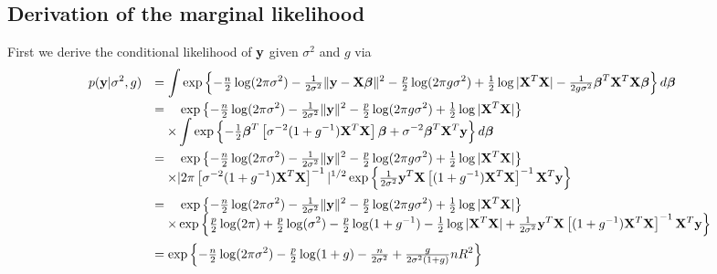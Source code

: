\subsection{Derivation of the marginal likelihood}

 
\noindent First we derive the conditional likelihood of ${\bf y}$ given $\sigma^2$ and $g$ via
$$
\begin{array}{rl}
	\displaystyle p({\bf y}|\sigma^2,g) 
	  & \displaystyle = \int \exp\left\{ 
	-\tfrac{n}{2}\log(2\pi\sigma^2) - \tfrac{1}{2\sigma^2}\|{\bf y} - {\bf X}{\boldsymbol \beta}\|^2
	-\tfrac{p}{2}\log(2\pi g\sigma^2) + \tfrac{1}{2}\log|{\bf X}^T{\bf X}| - \tfrac{1}{2g\sigma^2}{\boldsymbol \beta}^T{\bf X}^T{\bf X}{\boldsymbol \beta}
	\right\} d{\boldsymbol \beta}
	\\ [2ex]
	  & \displaystyle = \quad \exp\left\{      
	-\tfrac{n}{2}\log(2\pi\sigma^2) - \tfrac{1}{2\sigma^2}\|{\bf y}\|^2 -\tfrac{p}{2}\log(2\pi g\sigma^2) + \tfrac{1}{2}\log|{\bf X}^T{\bf X}| \right\}
	\\
	  & \displaystyle \quad \times \int 
	\exp\left\{ - \tfrac{1}{2}{\boldsymbol \beta}^T \left[ \sigma^{-2}(1+g^{-1}){\bf X}^T{\bf X} \right]{\boldsymbol\beta} + \sigma^{-2}{\boldsymbol \beta}^T{\bf X}^T{\bf y}
	\right\} d{\boldsymbol \beta} \\ [2ex]
	  & \displaystyle = \quad \exp\left\{      
	-\tfrac{n}{2}\log(2\pi\sigma^2) - \tfrac{1}{2\sigma^2}\|{\bf y}\|^2 -\tfrac{p}{2}\log(2\pi g\sigma^2) + \tfrac{1}{2}\log|{\bf X}^T{\bf X}| \right\}
	\\
	  & \displaystyle \quad \times      
	|2\pi \left[ \sigma^{-2}(1+g^{-1}){\bf X}^T{\bf X} \right]^{-1}|^{1/2}\exp\left\{  \tfrac{1}{2\sigma^2}  {\bf y}^T{\bf X}\left[ (1+g^{-1}){\bf X}^T{\bf X} \right]^{-1}{\bf X}^T{\bf y}
	\right\}
	\\ [2ex]
	  & \displaystyle = \quad \exp\left\{      
	-\tfrac{n}{2}\log(2\pi\sigma^2) 
	- \tfrac{1}{2\sigma^2}\|{\bf y}\|^2 
	-\tfrac{p}{2}\log(2\pi g\sigma^2) 
	+ \tfrac{1}{2}\log|{\bf X}^T{\bf X}| \right\}
	\\
	  & \displaystyle \quad \times      
	\exp\left\{ 
	\tfrac{p}{2}\log(2\pi) 
	+ \tfrac{p}{2}\log(\sigma^2)
	- \tfrac{p}{2}\log(1+g^{-1})
	- \tfrac{1}{2}\log|{\bf X}^T{\bf X}| 
	+ \tfrac{1}{2\sigma^2}  {\bf y}^T{\bf X}\left[ (1+g^{-1}){\bf X}^T{\bf X} \right]^{-1}{\bf X}^T{\bf y}
	\right\}
	\\ [2ex]
	  & \displaystyle = \exp\left\{      
	-\tfrac{n}{2}\log(2\pi\sigma^2) 
	- \tfrac{p}{2}\log(1+g)
	- \tfrac{n}{2\sigma^2} 
	+ \tfrac{g}{2\sigma^2(1+g)} n R^2
	\right\}
\end{array}
$$

